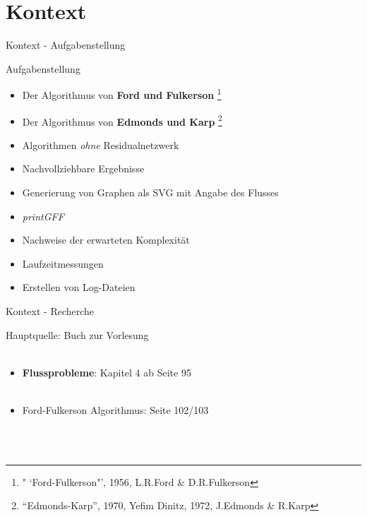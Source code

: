 \documentclass{beamer}
\begin{document}
    \section{Kontext}
    \begin{frame}{Kontext - Aufgabenstellung}
        \begin{block}{Aufgabenstellung}
            \begin{itemize}
                \item Der Algorithmus von \textbf{Ford und Fulkerson} \footnote{" `Ford-Fulkerson"', 1956, L.R.Ford \& D.R.Fulkerson}
                \item Der Algorithmus von \textbf{Edmonds und Karp} \footnote{"`Edmonds-Karp"', 1970, Yefim Dinitz, 1972, J.Edmonds \& R.Karp}
                \item Algorithmen \textit{ohne} Residualnetzwerk
                \item Nachvollziehbare Ergebnisse
                \item Generierung von Graphen als SVG mit Angabe des Flusses
                \item \textit{printGFF}
                \item Nachweise der erwarteten Komplexit\"at
                \item Laufzeitmessungen
                \item Erstellen von Log-Dateien
            \end{itemize}
        \end{block}
    \end{frame}

    \begin{frame}{Kontext - Recherche}
        \begin{block}{Hauptquelle: Buch zur Vorlesung}
            \\~\\
            \begin{itemize}
                \item \textbf{Flussprobleme}: Kapitel 4 ab Seite 95\\~\\
                \item Ford-Fulkerson Algorithmus: Seite 102/103
            \end{itemize}
            \\~\\
        \end{block}
    \end{frame}
\end{document}
